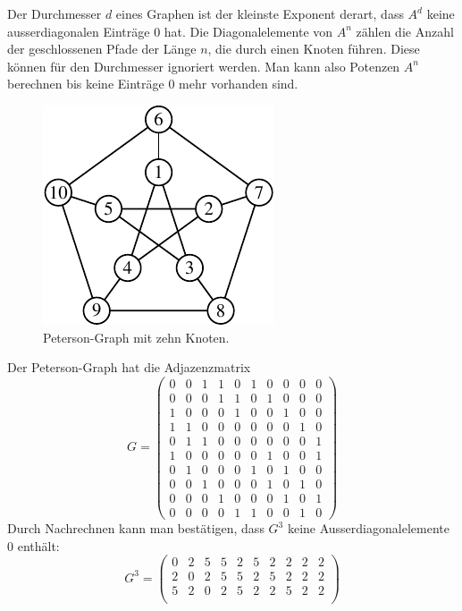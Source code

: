 Der Durchmesser $d$ eines Graphen ist der kleinste Exponent derart,
dass $A^d$ keine ausserdiagonalen Einträge $0$ hat.
Die Diagonalelemente von $A^n$ zählen die Anzahl der geschlossenen Pfade
der Länge $n$, die durch einen Knoten führen.
Diese können für den Durchmesser ignoriert werden.
Man kann also Potenzen $A^n$ berechnen bis keine Einträge $0$ mehr vorhanden
sind.

\begin{beispiel}
\begin{figure}
\centering
\includegraphics{chapters/70-graphen/images/peterson.pdf}
\caption{Peterson-Graph mit zehn Knoten.
\label{buch:figure:peterson}}
\end{figure}
Der Peterson-Graph hat die Adjazenzmatrix
\[
G
=
\begin{pmatrix}
 0& 0& 1& 1& 0& 1& 0& 0& 0& 0\\ %
 0& 0& 0& 1& 1& 0& 1& 0& 0& 0\\ %
 1& 0& 0& 0& 1& 0& 0& 1& 0& 0\\ %
 1& 1& 0& 0& 0& 0& 0& 0& 1& 0\\ %
 0& 1& 1& 0& 0& 0& 0& 0& 0& 1\\ %
 1& 0& 0& 0& 0& 0& 1& 0& 0& 1\\ %
 0& 1& 0& 0& 0& 1& 0& 1& 0& 0\\ %
 0& 0& 1& 0& 0& 0& 1& 0& 1& 0\\ %
 0& 0& 0& 1& 0& 0& 0& 1& 0& 1\\ %
 0& 0& 0& 0& 1& 1& 0& 0& 1& 0   %
\end{pmatrix}
\]
Durch Nachrechnen kann man bestätigen, dass $G^3$ keine
Ausserdiagonalelemente $0$ enthält:
\[
G^3
=
\begin{pmatrix}
 0& 2& 5& 5& 2& 5& 2& 2& 2& 2\\
 2& 0& 2& 5& 5& 2& 5& 2& 2& 2\\
 5& 2& 0& 2& 5& 2& 2& 5& 2& 2\\

\end{pmatrix}\]
\end{beispiel}
